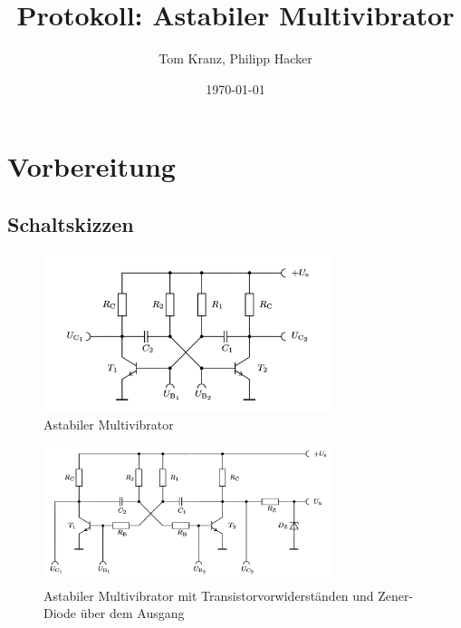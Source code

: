 \documentclass[numbers=noenddot,10pt,a4paper]{scrartcl}
\title{Protokoll: Astabiler Multivibrator}
\author{Tom Kranz, Philipp Hacker}
\date{\today}
\begin{document}
\maketitle
\vspace*{\fill}
\tableofcontents
\vfill
\newpage
\section{Vorbereitung}
\subsection{Schaltskizzen}
\begin{figure}[H]
\centering
\includegraphics[width=0.75\textwidth]{schaltskizze1}
\caption{Astabiler Multivibrator}
\end{figure}
\begin{figure}[H]
\centering
\includegraphics[width=0.75\textwidth]{schaltskizze2}
\caption{Astabiler Multivibrator mit Transistorvorwiderständen und Zener-Diode über dem Ausgang}
\end{figure}
\end{document}
